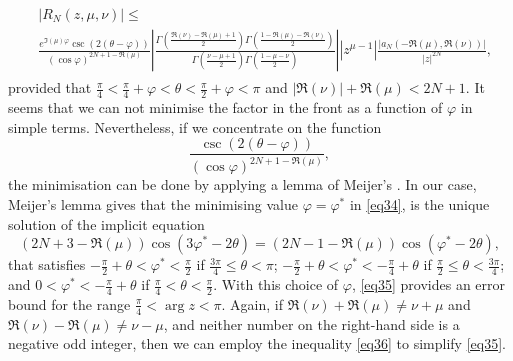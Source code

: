 \documentclass[a4paper,twoside,10pt]{amsart}
\numberwithin{equation}{section}
\begin{document}
\begin{gather}\label{eq35}
\begin{split}
& \left| {R_N \left( {z,\mu ,\nu } \right)} \right| \le \\ &
\frac{{e^{\Im \left( \mu  \right)\varphi } \csc \left( {2\left( {\theta  - \varphi } \right)} \right)}}{{\left( {\cos \varphi } \right)^{2N + 1 - \Re \left( \mu  \right)} }}\left| {\frac{{\Gamma \left( {\frac{{\Re \left( \nu  \right) - \Re \left( \mu  \right) + 1}}{2}} \right)\Gamma \left( {\frac{{1 - \Re \left( \mu  \right) - \Re \left( \nu  \right)}}{2}} \right)}}{{\Gamma \left( {\frac{{\nu  - \mu  + 1}}{2}} \right)\Gamma \left( {\frac{{1 - \mu  - \nu }}{2}} \right)}}} \right|\left| {z^{\mu  - 1} } \right|\frac{{\left| {a_N \left( { - \Re \left( \mu  \right),\Re \left( \nu  \right)} \right)} \right|}}{{\left| z \right|^{2N} }},
\end{split}
\end{gather}
provided that $\frac{\pi }{4} < \frac{\pi }{4} + \varphi  < \theta  < \frac{\pi }{2} + \varphi < \pi$ and $\left| {\Re \left( \nu  \right)} \right| + \Re \left( \mu  \right) < 2N + 1$. It seems that we can not minimise the factor in the front as a function of $\varphi$ in simple terms. Nevertheless, if we concentrate on the function
\begin{equation}\label{eq34}
\frac{ \csc \left( {2\left( {\theta  - \varphi } \right)} \right)}{\left( {\cos \varphi } \right)^{2N + 1 - \Re \left( \mu  \right)}},
\end{equation}
the minimisation can be done by applying a lemma of Meijer's \cite[p. 956]{Meijer}. In our case, Meijer's lemma gives that the minimising value $\varphi = \varphi^\ast$ in \eqref{eq34}, is the unique solution of the implicit equation
\[
\left( {2N + 3 - \Re \left( \mu  \right)} \right)\cos \left( {3\varphi^\ast - 2\theta} \right) = \left( {2N - 1 - \Re \left( \mu  \right)} \right)\cos \left( {\varphi^\ast- 2\theta } \right),
\]
that satisfies $-\frac{\pi}{2}+\theta < \varphi^\ast <\frac{\pi}{2}$ if $\frac{3\pi}{4} \leq \theta <\pi$; $-\frac{\pi}{2}+\theta < \varphi^\ast <-\frac{\pi}{4}+\theta$ if $\frac{\pi}{2} \leq \theta <\frac{3\pi}{4}$; and $0 < \varphi^\ast <-\frac{\pi}{4}+\theta$ if $\frac{\pi}{4} < \theta <\frac{\pi}{2}$. With this choice of $\varphi$, \eqref{eq35} provides an error bound for the range $\frac{\pi}{4}<\arg z <\pi$. Again, if $\Re \left( \nu  \right) + \Re \left( \mu  \right) \neq \nu + \mu$ and $\Re \left( \nu  \right) - \Re \left( \mu  \right) \neq \nu - \mu$, and neither number on the right-hand side is a negative odd integer, then we can employ the inequality \eqref{eq36} to simplify \eqref{eq35}.
\end{document}
